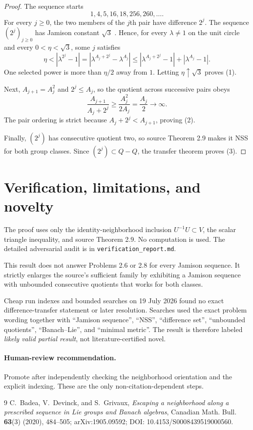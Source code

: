 \documentclass[11pt]{article}
\begin{document}
\begin{proof}
The sequence starts
\[
  1,4,5,16,18,256,260,\ldots.
\]
For every $j\ge0$, the two members of the $j$th pair have difference $2^j$.
The sequence $(2^j)_{j\ge0}$ has Jamison constant $\sqrt3$ \cite{BDG}.  Hence,
for every $\lambda\ne1$ on the unit circle and every $0<\eta<\sqrt3$, some
$j$ satisfies
\[
 \eta< |\lambda^{2^j}-1|
 =|\lambda^{A_j+2^j}-\lambda^{A_j}|
 \le |\lambda^{A_j+2^j}-1|+|\lambda^{A_j}-1|.
\]
One selected power is more than $\eta/2$ away from $1$.  Letting
$\eta\uparrow\sqrt3$ proves (1).

Next, $A_{j+1}=A_j^2$ and $2^j\le A_j$, so the quotient across successive
pairs obeys
\[
 \frac{A_{j+1}}{A_j+2^j}
 \ge \frac{A_j^2}{2A_j}=\frac{A_j}{2}\longrightarrow\infty.
\]
The pair ordering is strict because $A_j+2^j<A_{j+1}$, proving (2).

Finally, $(2^j)$ has consecutive quotient two, so source Theorem 2.9 makes it
NSS for both group classes.  Since $(2^j)\subset Q-Q$, the transfer theorem
proves (3).
\end{proof}

\section{Verification, limitations, and novelty}

The proof uses only the identity-neighborhood inclusion $U^{-1}U\subset V$,
the scalar triangle inequality, and source Theorem 2.9.  No computation is
used.  The detailed adversarial audit is in
\texttt{verification\_report.md}.

This result does not answer Problems 2.6 or 2.8 for every Jamison sequence.
It strictly enlarges the source's sufficient family by exhibiting a Jamison
sequence with unbounded consecutive quotients that works for both classes.

Cheap run indexes and bounded searches on 19 July 2026 found no exact
difference-transfer statement or later resolution.  Searches used the exact
problem wording together with ``Jamison sequence'', ``NSS'', ``difference
set'', ``unbounded quotients'', ``Banach--Lie'', and ``minimal metric''.
The result is therefore labeled \emph{likely valid partial result}, not
literature-certified novel.

\paragraph{Human-review recommendation.}
Promote after independently checking the neighborhood orientation and the
explicit indexing.  These are the only non-citation-dependent steps.

\begin{thebibliography}{9}
C.~Badea, V.~Devinck, and S.~Grivaux,
\emph{Escaping a neighborhood along a prescribed sequence in Lie groups and
Banach algebras},
Canadian Math. Bull. \textbf{63}(3) (2020), 484--505;
arXiv:1905.09592; DOI: 10.4153/S0008439519000560.
\end{thebibliography}
\end{document}
